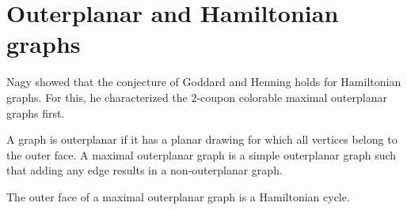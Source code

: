 \section{Outerplanar and Hamiltonian graphs}
Nagy \cite{outerplanar} showed that the conjecture of Goddard and Henning holds for
Hamiltonian graphs. For this, he characterized the $2$-coupon colorable
maximal outerplanar graphs first.

\begin{definition}
   A graph is outerplanar if it has a planar drawing for which all vertices
   belong to the outer face. A maximal outerplanar graph is a simple outerplanar graph
   such that adding any edge results in a non-outerplanar graph.
\end{definition}
\begin{remark}
  The outer face of a maximal outerplanar graph is a Hamiltonian cycle.
\end{remark}

